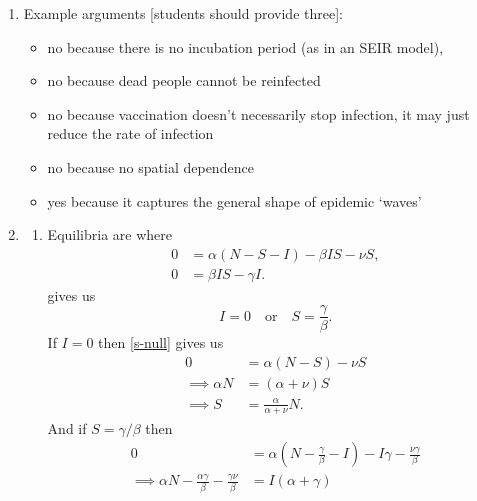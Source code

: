 \documentclass[a4paper,12pt]{article}
\begin{document}
\begin{enumerate}[label={\bf \arabic{*}.\;}, ref={\arabic{*}},itemsep=3ex, left=0ex]
{\begin{enumerate}
\begin{itemize}
        \item $\beta$: infection rate; $\text{people}^{-1}\text{time}^{-1}$, 
        \item $\gamma$: recovery rate (possibly death rate, but dubious since it is possible to leave the group $R$); $\text{time}^{-1}$.
    \end{itemize}
    \item %
    Example arguments [students should provide three]:
    \begin{itemize}
        \item no because there is no incubation period (as in an SEIR model),
        \item no because dead people cannot be reinfected
        \item no because vaccination doesn't necessarily stop infection, it may just reduce the rate of infection
        \item no because no spatial dependence
        \item yes because it captures the general shape of epidemic `waves'
    \end{itemize}
    \item %
    \begin{enumerate}[label=(\roman*)]
        \item %
        Equilibria are where
        \begin{align}
            0 &= \alpha(N-S-I)-\beta IS - \nu S, \label{s-null} \\
            0 &= \beta IS - \gamma I. \label{i-null}
        \end{align}
         gives us
        \begin{equation*}
            I = 0 \quad \text{or} \quad S = \frac\gamma\beta.
        \end{equation*}
        If $I=0$ then \cref{s-null} gives us
        \begin{align*}
            0 &= \alpha(N-S)-\nu S \\
            \implies \alpha N &= (\alpha+\nu)S \\
            \implies S &= \frac{\alpha}{\alpha+\nu}N.
        \end{align*}
        And if $S = \gamma/\beta$ then
        \begin{align*}
            0 &= \alpha\left( N - \frac\gamma\beta - I \right) - I \gamma - \frac{\nu \gamma}{\beta} \\
            \implies \alpha N - \frac{\alpha \gamma}{\beta} - \frac{\gamma\nu}{\beta} &= I(\alpha + \gamma)\\

\end{align*}
\end{enumerate}
\end{enumerate}}
\end{enumerate}
\end{document}
